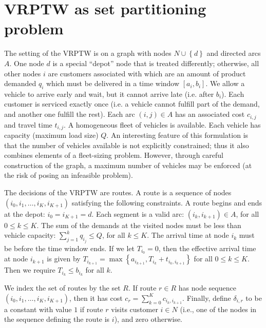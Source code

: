 \documentclass[11pt]{article}
\theoremstyle{definition}
\newcommand{\set}[1]{\left\{ #1 \right\}}
\newcommand{\smallsum}{{\textstyle{\sum}}}
\newcommand{\0}{\mathbf{0}}
\begin{document}
\section{VRPTW as set partitioning problem}

The setting of the VRPTW is on a graph with nodes $N \cup \set{d}$ and directed arcs $A$.
One node $d$ is a special ``depot'' node that is treated differently;
otherwise, all other nodes $i$ are customers associated with which are an amount of product demanded $q_i$ which must be delivered in a time window $[a_i,b_i]$.
We allow a vehicle to arrive early and wait, but it cannot arrive late (i.e. after $b_i$).
Each customer is serviced exactly once (i.e. a vehicle cannot fulfill part of the demand, and another one fulfill the rest).
Each arc $(i,j) \in A$ has an associated cost $c_{i,j}$ and travel time $t_{i,j}$.
A homogeneous fleet of vehicles is available.
Each vehicle has capacity (maximum load size) $Q$.
An interesting feature of this formulation is that the number of vehicles available is not explicitly constrained; 
thus it also combines elements of a fleet-sizing problem.
However, through careful construction of the graph, a maximum number of vehicles may be enforced (at the risk of posing an infeasible problem).

The decisions of the VRPTW are routes.
A route is a sequence of nodes $(i_0, i_1, \dots , i_K, i_{K+1})$ satisfying the following constraints.
A route begins and ends at the depot: $i_0 = i_{K+1} = d$.
Each segment is a valid arc: $(i_k,i_{k+1}) \in A$, for all $0 \le k \le K$.
The sum of the demands at the visited nodes must be less than vehicle capacity: $\smallsum_{j=1}^{k} q_{i_j} \le Q$, for all $k \le K$.
The arrival time at node $i_k$ must be before the time window ends.
If we let $T_{i_0} = 0$, then the effective arrival time at node $i_{k+1}$ is given by
$T_{i_{k+1}} = \max\set{a_{i_{k+1}}, T_{i_k} + t_{i_k,i_{k+1}} }$ for all $0 \le k \le K$.
Then we require $T_{i_k} \le b_{i_k}$ for all $k$.

We index the set of routes by the set $R$.
If route $r \in R$ has node sequence $(i_0, i_1, \dots , i_K, i_{K+1})$, then it has cost $c_r = \smallsum_{k=0}^{K} c_{i_k,i_{k+1}}$.
Finally, define $\delta_{i,r}$ to be a constant with value $1$ if route $r$ visits customer $i \in N$
(i.e., one of the nodes in the sequence defining the route is $i$), 
and zero otherwise.
\end{document}
